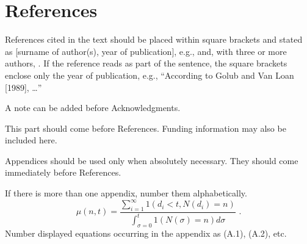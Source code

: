 \documentclass{ws-ijbc}
\begin{document}
\section{References}
References cited in the text should be placed within square
brackets and stated as [surname of author(s), year of
publication], e.g., \cite{Golub89} and, with three
or more authors, \cite{Hall97}. If the reference reads as part of
the sentence, the square brackets enclose only the year of
publication, e.g., ``According to Golub and Van Loan [1989], \ldots''







 \noindent A note can be added before
Acknowledgments.


 \noindent This part should come
before References. Funding information may also be included here.

 \noindent Appendices should be used only
when absolutely necessary. They should come immediately before
References.

\appendix{}
If there is more than one appendix, number them alphabetically.
\begin{equation}
\mu(n, t) = \frac{\displaystyle\sum^\infty_{i=1} 1(d_i < t, N(d_i) = n)}
{\displaystyle\int^t_{\sigma=0} 1(N(\sigma) = n)d\sigma}\,\,
.\label{that}
\end{equation}
Number displayed equations occurring in the appendix as (A.1),
(A.2), etc.
\end{document}
